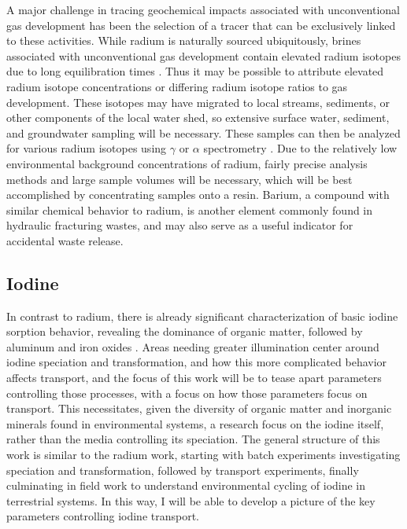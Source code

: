 \documentclass[twoside,12pt,titlepage]{article}
\begin{document}
\par A major challenge in tracing geochemical impacts associated with unconventional gas development has been the selection of a tracer that can be exclusively linked to these activities. While radium is naturally sourced ubiquitously, brines associated with unconventional gas development contain elevated radium isotopes due to long equilibration times \cite{Barbot2013}. Thus it may be possible to attribute elevated radium isotope concentrations or differing radium isotope ratios to gas development. These isotopes may have migrated to local streams, sediments, or other components of the local water shed, so extensive surface water, sediment, and groundwater sampling will be necessary. These samples can then be analyzed for various radium isotopes using $\gamma$ or $\alpha$ spectrometry \cite{Elsinger1982,Bojanowski2005}. Due to the relatively low environmental background concentrations of radium, fairly precise analysis methods and large sample volumes will be necessary, which will be best accomplished by concentrating samples onto a resin. Barium, a compound with similar chemical behavior to radium, is another element commonly found in hydraulic fracturing wastes, and may also serve as a useful indicator for accidental waste release.

\subsection{Iodine}

In contrast to radium, there is already significant characterization of basic iodine sorption behavior, revealing the dominance of organic matter, followed by aluminum and iron oxides \cite{Kaplan2014}. Areas needing greater illumination center around iodine speciation and transformation, and how this more complicated behavior affects transport, and the focus of this work will be to tease apart parameters controlling those processes, with a focus on how those parameters focus on transport. This necessitates, given the diversity of organic matter and inorganic minerals found in environmental systems, a research focus on the iodine itself, rather than the media controlling its speciation. The general structure of this work is similar to the radium work, starting with batch experiments investigating speciation and transformation, followed by transport experiments, finally culminating in field work to understand environmental cycling of iodine in terrestrial systems. In this way, I will be able to develop a picture of the key parameters controlling iodine transport.
\end{document}
